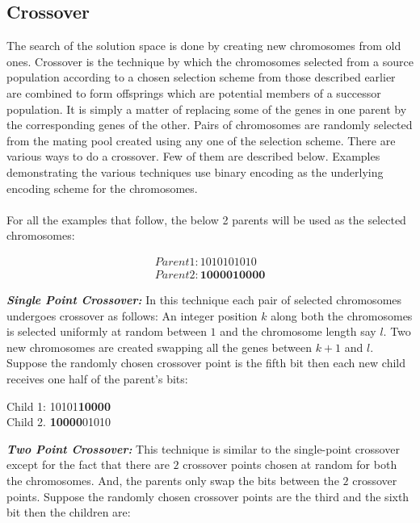 \documentclass[a4paper, 12pt]{article}
\begin{document}
\subsection{Crossover}
The search of the solution space is done by creating new chromosomes from old ones. Crossover is the technique by which the chromosomes 
selected from a source population according to a chosen selection scheme from those described earlier are combined to form offsprings which are potential members of a successor population. It is simply a matter of replacing some of the genes in one parent by the corresponding genes of the other. Pairs of chromosomes are randomly selected from the mating pool created using any one of the selection scheme. There are various ways to do a crossover. Few of them are described below. Examples demonstrating the various techniques use binary encoding as the underlying encoding scheme for the chromosomes.\\~\\
For all the examples that follow, the below 2 parents will be used as the selected chromosomes:
\begin{center}
\begin{align*}
Parent 1: 1010101010\\
Parent 2: \textbf{1000010000}
\end{align*}
\end{center}
\textbf{\textit{Single Point Crossover: }}
In this technique each pair of selected chromosomes undergoes crossover as follows: An integer position $k$ along both the chromosomes is 
selected uniformly at random between $1$ and the chromosome length say $l$. Two new chromosomes are created swapping all the genes between $k+1$ and $l$. Suppose the randomly chosen crossover point is the fifth bit then each new child receives one half of the parent's bits:
\begin{center}
Child 1: 10101\textbf{10000}\\
Child 2. \textbf{10000}01010
\end{center}
\textbf{\textit{Two Point Crossover: }}
This technique is similar to the single-point crossover except for the fact that there are $2$ crossover points chosen at random for both the
chromosomes. And, the parents only swap the bits between the $2$ crossover points. Suppose the randomly chosen crossover points are the third 
and the sixth bit then the children are:
\end{document}
